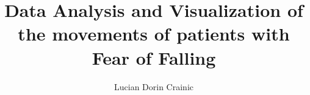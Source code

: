 \documentclass[binding=0.6cm]{sapthesis}
\title{Data Analysis and Visualization of the movements of patients with Fear of Falling}
\author{Lucian Dorin Crainic}
\begin{document}
\lstset{language=Python}

\frontmatter

\maketitle

\dedication{
    "When my bird was looking at my computer monitor, i thought 'woah, that bird
    has no idea what he's looking at'. And yet, what does the bird doo, does he 
    panic? No, he can't really panic, he just does the best he can. Is he 
    able to live in a world where he's so ignorant? Well, he dosen't 
    really have a choice. Yeah, he can kinda live.. usually the bird's okay,
    even though he dosen't understand the world, and he can kinda learn
    what's safe and what's dangerous. So uh, that's where I've been living."\\ \emph{ - Terry A. Davis}
}




\cleardoublepage

\tableofcontents
\cleardoublepage

\mainmatter


















\end{document}
